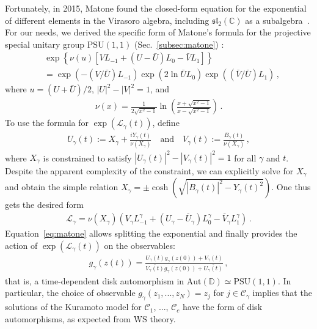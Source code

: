 \documentclass[aps,pre,reprint,longbibliography,superscriptaddress,noshowpacs,floatfix]{revtex4-2}
\theoremstyle{definition}
\theoremstyle{remark}
\begin{document}
Fortunately, in 2015, Matone found the closed-form equation for the exponential of different elements in the Virasoro algebra, including $\mathfrak{sl}_2(\mathbb{C})$ as a subalgebra~\cite{Matone2015}. For our needs, we derived the specific form of Matone's formula for the projective special unitary group $\mathrm{PSU}(1,1)$ (Sec.~\ref{subsec:matone}) :
\begin{align}\label{eq:matone}
    &\exp\left\{\nu(u)\left[VL_{-1} + (U - \bar{U})L_0 -\bar{V}L_1\right]\right\}\\ &= \exp(-(V/\bar{U}) L_{-1})\exp(2\ln \bar{U} L_0)\exp((\bar{V}/\bar{U}) L_1)\,,\nonumber
\end{align}
where $u = (U + \bar{U})/2$, $|U|^2 - |V|^2 = 1$, and
\begin{align*}
    \nu(x) = \frac{1}{2\sqrt{x^2 - 1}}\ln\left(\frac{x + \sqrt{x^2 - 1}}{x - \sqrt{x^2 -1}}\right)\,.
\end{align*}
To use the formula for $\exp\left(\mathcal{L}_{\gamma}(t)\right)$, define
\begin{align*}
    U_{\gamma}(t) := X_{\gamma} + \frac{i Y_{\gamma}(t)}{\nu(X_{\gamma})}\quad\text{and}\quad
    V_{\gamma}(t) := \frac{B_{\gamma}(t)}{\nu(X_{\gamma})}\,,
\end{align*}
where $X_{\gamma}$ is constrained to satisfy $|U_{\gamma}(t)|^2 - |V_{\gamma}(t)|^2 = 1$ for all $\gamma$ and $t$. Despite the apparent complexity of the constraint, we can explicitly solve for $X_{\gamma}$ and obtain the simple relation $X_{\gamma} = \pm \cosh(\sqrt{|B_{\gamma}(t)|^2 - Y_{\gamma}(t)^2})$. One thus gets the desired form
\begin{align*}
    \mathcal{L}_{\gamma} = \nu(X_{\gamma})(V_{\gamma}L_{-1}^{\gamma} + (U_{\gamma} - \overline{U}_{\gamma})L_0^{\gamma} - \overline{V}_{\gamma}L_1^{\gamma})\,.
\end{align*}
Equation~\eqref{eq:matone} allows splitting the exponential and finally provides the action of $\exp\left(\mathcal{L}_{\gamma}(t)\right)$ on the observables:
\begin{align}\label{eq:sol_gen_ric}
    g_{\gamma}(z(t)) = \frac{U_{\gamma}(t)g_{\gamma}(z(0)) + V_{\gamma}(t)}{\overline{V_{\gamma}(t)}g_{\gamma}(z(0)) + \overline{U_{\gamma}(t)}}\,,
\end{align}
that is, a time-dependent disk automorphism in $\mathrm{Aut}(\mathbb{D}) \simeq \mathrm{PSU}(1,1)$. In particular, the choice of observable $g_\gamma(z_1,...,z_N) = z_j$ for $j\in \mathcal{C}_\gamma$ implies that the solutions of the Kuramoto model for $\mathcal{C}_1$, ..., $\mathcal{C}_c$ have the form of disk automorphisms, as expected from WS theory.
\end{document}
